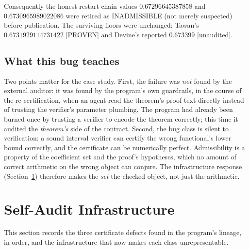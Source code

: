 \documentclass[11pt]{article}
\begin{document}
Consequently the honest-restart chain values
$0.67296645387858$ and $0.6730965989022086$ were retired as INADMISSIBLE (not
merely suspected) before publication. The surviving floors were unchanged:
Tawan's $0.6731929114731422$ [PROVEN] and Devine's reported $0.673399$
[unaudited].

\subsection{What this bug teaches}
Two points matter for the case study. First, the failure was \emph{not} found
by the external auditor: it was found by the program's own guardrails, in the
course of the re-certification, when an agent read the theorem's proof text
directly instead of trusting the verifier's parameter plumbing. The program had
already been burned once by trusting a verifier to encode the theorem correctly;
this time it audited the \emph{theorem's} side of the contract. Second, the bug
class is silent to verification: a sound interval verifier can certify the
wrong functional's lower bound correctly, and the certificate can be
numerically perfect. Admissibility is a property of the coefficient set and the
proof's hypotheses, which no amount of correct arithmetic on the wrong object
can conjure. The infrastructure response (Section~\ref{sec:infra}) therefore
makes the \emph{set} the checked object, not just the arithmetic.

\section{Self-Audit Infrastructure}
\label{sec:infra}

This section records the three certificate defects found in the program's
lineage, in order, and the infrastructure that now makes each class
unrepresentable.
\end{document}
